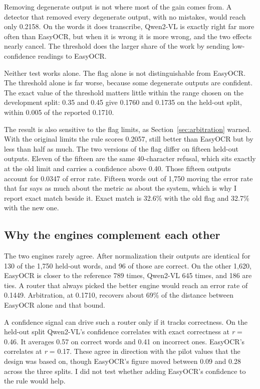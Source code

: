\documentclass[11pt,a4paper]{article}
\begin{document}
Removing degenerate output is not where most of the gain comes from. A
detector that removed every degenerate output, with no mistakes, would reach
only 0.2158. On the words it does transcribe, Qwen2-VL is exactly right far
more often than EasyOCR, but when it is wrong it is more wrong, and the two
effects nearly cancel. The threshold does the larger share of the work by
sending low-confidence readings to EasyOCR.

Neither test works alone. The flag alone is not distinguishable from EasyOCR.
The threshold alone is far worse, because some degenerate outputs are
confident. The exact value of the threshold matters little within the range
chosen on the development split: 0.35 and 0.45 give 0.1760 and 0.1735 on the
held-out split, within 0.005 of the reported 0.1710.

The result is also sensitive to the flag limits, as Section~\ref{sec:arbitration} warned. With
the original limits the rule scores 0.2057, still better than EasyOCR but by
less than half as much. The two versions of the flag differ on fifteen
held-out outputs. Eleven of the fifteen are the same 40-character refusal,
which sits exactly at the old limit and carries a confidence above 0.40. Those
fifteen outputs account for 0.0347 of error rate. Fifteen words out of 1,750
moving the error rate that far says as much about the metric as about the
system, which is why I report exact match beside it. Exact match is 32.6\%
with the old flag and 32.7\% with the new one.

\subsection{Why the engines complement each other}

The two engines rarely agree. After normalization their outputs are identical
for 130 of the 1,750 held-out words, and 96 of those are correct. On the other
1,620, EasyOCR is closer to the reference 789 times, Qwen2-VL 645 times, and
186 are ties. A router that always picked the better engine would reach an
error rate of 0.1449. Arbitration, at 0.1710, recovers about 69\% of the
distance between EasyOCR alone and that bound.

A confidence signal can drive such a router only if it tracks correctness. On
the held-out split Qwen2-VL's confidence correlates with exact correctness at
\emph{r} = 0.46. It averages 0.57 on correct words and 0.41 on incorrect ones.
EasyOCR's correlates at \emph{r} = 0.17. These agree in direction with the pilot
values that the design was based on, though EasyOCR's figure moved between
0.09 and 0.28 across the three splits. I did not test whether adding EasyOCR's
confidence to the rule would help.
\end{document}
